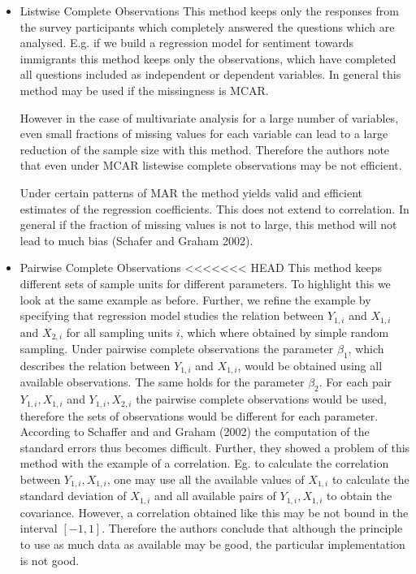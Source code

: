 \begin{itemize}
\item Listwise Complete Observations
This method keeps only the responses from the survey participants which completely answered the questions which are analysed. E.g. if we build a regression model for sentiment towards immigrants this method keeps only the observations, which have completed all questions included as independent or dependent variables.
In general this method may be used if the missingness is MCAR. \par However in the case of multivariate analysis for a large number of variables, even small fractions of missing values for each variable can lead to a large reduction of the sample size with this method. Therefore the authors note that even under MCAR listewise complete observations may be not efficient. \par Under certain patterns of MAR the method yields valid and efficient estimates of the regression coefficients. This does not extend to correlation. In general if the fraction of missing values is not to large, this method will not lead to much bias (Schafer and Graham 2002).  
\item Pairwise Complete Observations 
<<<<<<< HEAD
This method keeps different sets of sample units for different parameters. To highlight this we look at the same example as before. Further, we refine the example by specifying that regression model studies the relation between $Y_{1,i}$ and $X_{1,i}$ and $X_{2,i}$ for all sampling units $i$, which where obtained by simple random sampling. Under pairwise complete observations the parameter $\beta_1$, which describes the relation between  $Y_{1,i}$ and $X_{1,i}$, would be obtained using all available observations. The same holds for the parameter $\beta_2$. For each pair $Y_{1,i} , X_{1,i}$  and  $Y_{1,i} , X_{2,i}$ the pairwise complete observations would be used, therefore the sets of observations would be different for each parameter. According to Schaffer and and Graham (2002) the computation of the standard errors thus becomes difficult. Further, they showed a problem of this method with the example of a correlation. Eg. to calculate the correlation between $Y_{1,i} , X_{1,i}$, one may use all the available values of $X_{1,i}$ to calculate the standard deviation of $X_{1,i}$ and all available pairs of $Y_{1,i}, X_{1,i}$ to obtain the covariance. However, a correlation obtained like this may be not bound in the interval $[-1,1]$. Therefore the authors conclude that although the principle to use as much data as available may be good, the particular implementation is not good.

\end{itemize}

